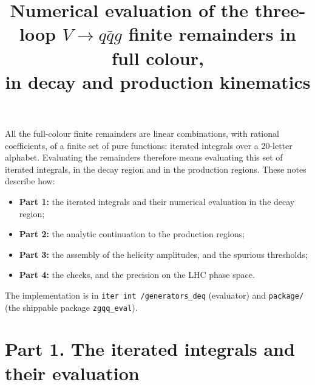 \documentclass[11pt]{article}
\title{Numerical evaluation of the three-loop $V\to q\bar q g$ finite remainders in full colour,\\
in decay and production kinematics}
\date{}
\begin{document}
\maketitle

\noindent All the full-colour finite remainders are linear combinations, with rational coefficients, of a finite set of
pure functions: iterated integrals over a 20-letter alphabet. Evaluating the remainders therefore means evaluating
this set of iterated integrals, in the decay region and in the production regions. These notes describe how:
\begin{itemize}
\item \textbf{Part 1:} the iterated integrals and their numerical evaluation in the decay region;
\item \textbf{Part 2:} the analytic continuation to the production regions;
\item \textbf{Part 3:} the assembly of the helicity amplitudes, and the spurious thresholds;
\item \textbf{Part 4:} the checks, and the precision on the LHC phase space.
\end{itemize}
The implementation is in \texttt{iter int /generators\_deq} (evaluator) and \texttt{package/} (the shippable package
\texttt{zgqq\_eval}).

\part*{Part 1. The iterated integrals and their evaluation}
\end{document}
